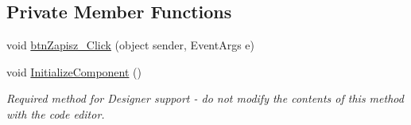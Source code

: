\subsection*{Private Member Functions}
\begin{DoxyCompactItemize}
\item 
void \hyperlink{class_dziennik_ocen_1_1_form_projekt_af5c591d1f084dde2ea7389a669882a57}{btn\+Zapisz\+\_\+\+Click} (object sender, Event\+Args e)
\item 
void \hyperlink{class_dziennik_ocen_1_1_form_projekt_a17fb1a9c33ba3c82ea1f93b9c7dceb7d}{Initialize\+Component} ()
\begin{DoxyCompactList}\small\item\em Required method for Designer support -\/ do not modify the contents of this method with the code editor. \end{DoxyCompactList}\end{DoxyCompactItemize}
